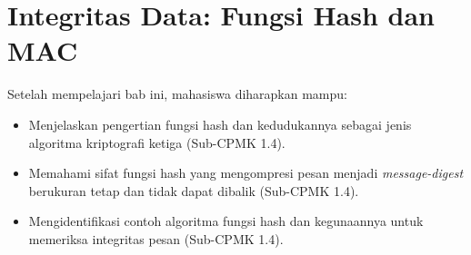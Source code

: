 \documentclass[../../main.tex]{subfiles}
\begin{document}
\chapter{Integritas Data: Fungsi Hash dan MAC}
\label{chap:hash-mac}

\begin{learningoutcome}
Setelah mempelajari bab ini, mahasiswa diharapkan mampu:
\begin{itemize}
    \item Menjelaskan pengertian fungsi hash dan kedudukannya sebagai jenis algoritma kriptografi ketiga (Sub-CPMK 1.4).
    \item Memahami sifat fungsi hash yang mengompresi pesan menjadi \textit{message-digest} berukuran tetap dan tidak dapat dibalik (Sub-CPMK 1.4).
    \item Mengidentifikasi contoh algoritma fungsi hash dan kegunaannya untuk memeriksa integritas pesan (Sub-CPMK 1.4).
\end{itemize}
\end{learningoutcome}









\end{document}
